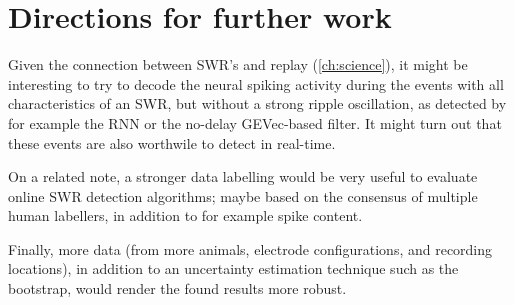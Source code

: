 \section{Directions for further work}

Given the connection between SWR's and replay (\cref{ch:science}), it might be interesting to try to decode the neural spiking activity during the events with all characteristics of an SWR, but without a strong ripple oscillation, as detected by for example the RNN or the no-delay GEVec-based filter. It might turn out that these events are also worthwile to detect in real-time.

On a related note, a stronger data labelling would be very useful to evaluate online SWR detection algorithms; maybe based on the consensus of multiple human labellers, in addition to for example spike content.

Finally, more data (from more animals, electrode configurations, and recording locations), in addition to an uncertainty estimation technique such as the bootstrap, would render the found results more robust.
